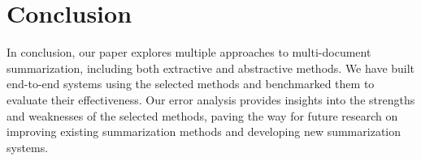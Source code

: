 \section{Conclusion}



In conclusion, our paper explores multiple approaches to multi-document summarization, including both extractive and abstractive methods. We have built end-to-end systems using the selected methods and benchmarked them to evaluate their effectiveness. 
Our error analysis provides insights into the strengths and weaknesses of the selected methods, paving the way for future research on improving existing summarization methods and developing new summarization systems.

